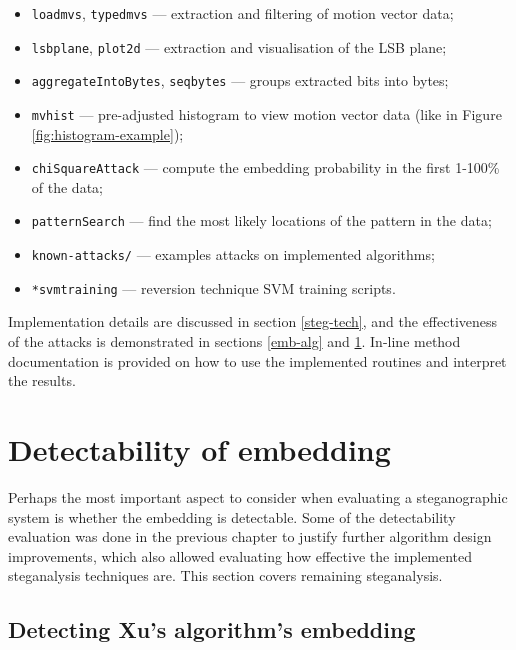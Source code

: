\documentclass[12pt,british,twoside,notitlepage,usenames,dvipsnames,hypens,final]{report}
\numberwithin{equation}{section}
\numberwithin{figure}{section}
\begin{document}
\begin{multicols}{2}
\begin{itemize}
\item \texttt{loadmvs}, \texttt{typedmvs} --- extraction and filtering of motion vector data;
\item \texttt{lsbplane}, \texttt{plot2d} --- extraction and visualisation of the LSB plane;
\item \texttt{aggregateIntoBytes}, \texttt{seqbytes} --- groups extracted bits into bytes;
\item \texttt{mvhist} --- pre-adjusted histogram to view motion vector data (like in Figure \ref{fig:histogram-example});
\item \texttt{chiSquareAttack} --- compute the embedding probability in the first 1-100\% of the data;
\item \texttt{patternSearch} --- find the most likely locations of the pattern in the data;
\item \texttt{known-attacks/} --- examples attacks on implemented algorithms;
\item \texttt{*svmtraining} --- reversion technique SVM training scripts.
\end{itemize}
\end{multicols}

Implementation details are discussed in section \ref{steg-tech}, and the effectiveness of the attacks is demonstrated in sections \ref{emb-alg} and \ref{rem-detect-eval}. In-line method documentation is provided on how to use the implemented routines and interpret the results. 

\section{Detectability of embedding}
\label{rem-detect-eval}

Perhaps the most important aspect to consider when evaluating a steganographic system is whether the embedding is detectable. Some of the detectability evaluation was done in the previous chapter to justify further algorithm design improvements, which also allowed evaluating how effective the implemented steganalysis techniques are. This section covers remaining steganalysis.

\subsection{Detecting Xu's algorithm's embedding}
\label{breaking-xu}
\end{document}
